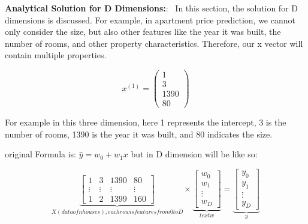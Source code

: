 \documentclass{article}
\renewcommand\text[1]{\textnormal{\textenglish{#1}}}
\newenvironment{cheatformula}[1][כותרת]{
    \begin{minipage}{\linewidth}
    \textbf{#1}:
}{
    \end{minipage}\\[2ex]
}
\begin{document}
\begin{multicols*}{2}
\begin{cheatformula}[Analytical Solution for D Dimensions:]\
In this section, the solution for D dimensions is discussed. For example, in apartment price prediction, we cannot only consider the size, but also other features like the year it was built, the number of rooms, and other property characteristics. Therefore, our x vector will contain multiple properties.

$$x ^{(1)}= \begin{pmatrix}
 1\\ 3 \\1390 \\80
\end{pmatrix}$$

For example in this three dimension, here 1 represents the intercept, 3 is the number of rooms, 1390 is the year it was built, and 80 indicates the size.

original Formula is: $  \widehat{y} = w_{0} + w_{1}x$  but in D dimension will be like so:



$$
\underbrace{ 
\begin{bmatrix}
 1 & 3 & 1390 & 80 \\
 \vdots & \vdots & \vdots & \vdots \\
 1 & 2 & 1399 & 160
\end{bmatrix} 
}_{X (data of n houses), each row is features from 0 to D} 
\times \underbrace{ 
\begin{bmatrix}
w_{0}  \\
w_{1}  \\
\vdots \\
w_{D} 
\end{bmatrix} 
}_{text{w}} =
\underbrace{ 
\begin{bmatrix}
y_{0}  \\
y_{1}  \\
\vdots \\
y_{D}
\end{bmatrix} 
}_{y}  
$$


\end{cheatformula}
\end{multicols*}
\end{document}
